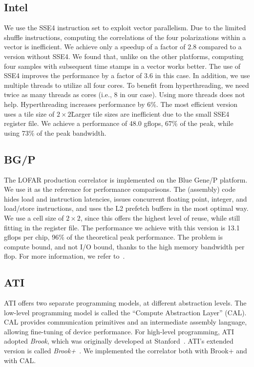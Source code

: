 \documentclass{article}
\begin{document}
\subsection{Intel}

We use the SSE4 instruction set to exploit vector parallelism.  Due to
the limited shuffle instructions, computing the correlations of the
four polarizations within a vector is inefficient. We achieve only a
speedup of a factor of 2.8 compared to a version without SSE4.  We
found that, unlike on the other platforms, computing four samples with
subsequent time stamps in a vector works better.  The use of SSE4
improves the performance by a factor of 3.6 in this case.  In
addition, we use multiple threads to utilize all four cores.  To
benefit from hyperthreading, we need twice as many threads as cores
(i.e., 8 in our case).  Using more threads does not
help. Hyperthreading increases performance by 6\%.  The most efficient
version uses a tile size of $2 \times 2$\.  Larger tile sizes are inefficient
due to the small SSE4 register file. We achieve a performance of 48.0
gflops, 67\% of the peak, while using 73\% of the peak bandwidth.

\subsection{BG/P}

The LOFAR production correlator is implemented on the Blue Gene/P platform.
We use it as the reference for performance comparisons.
The (assembly) code hides load and
instruction latencies, issues concurrent floating point, integer, and
load/store instructions, and uses the L2 prefetch buffers in the most
optimal way. 
We use a cell size of $2 \times 2$, since this offers the highest
level of reuse, while still fitting in the register file. 
The performance we achieve with this version is 13.1 gflops per chip,
96\% of the theoretical peak performance. 
The problem is compute bound, and not I/O bound, thanks to the
high memory bandwidth per flop.
For more information, we refer to~\cite{sc09}.

\subsection{ATI}

ATI offers two separate programming models, at different abstraction
levels.  The low-level programming model is called the ``Compute
Abstraction Layer'' (CAL).  CAL provides communication primitives and
an intermediate assembly language, allowing fine-tuning of device
performance. For high-level programming, ATI adopted \emph{Brook},
which was originally developed at Stanford~\cite{brook}. ATI's
extended version is called \emph{Brook+}~\cite{amd-manual}.  We
implemented the correlator both with Brook+ and with CAL.
\end{document}
